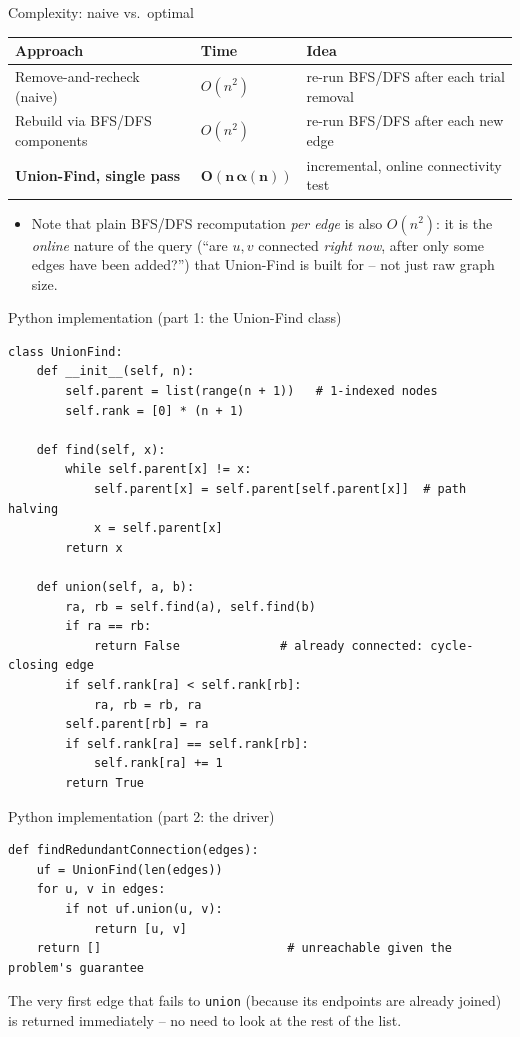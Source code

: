 \documentclass[11pt,aspectratio=169]{beamer}
\begin{document}
\begin{frame}{Complexity: naive vs.\ optimal}
  \begin{center}
  \begin{tabular}{@{}lll@{}}
    \toprule
    Approach & Time & Idea \\
    \midrule
    Remove-and-recheck (naive) & $O(n^2)$ & re-run BFS/DFS after each trial removal \\
    Rebuild via BFS/DFS components & $O(n^2)$ & re-run BFS/DFS after each new edge \\
    \textbf{Union-Find, single pass} & $\boldsymbol{O(n\,\alpha(n))}$ & incremental,
    online connectivity test \\
    \bottomrule
  \end{tabular}
  \end{center}
  \begin{itemize}
    \item Note that plain BFS/DFS recomputation \emph{per edge} is also $O(n^2)$: it is
    the \emph{online} nature of the query (``are $u,v$ connected \emph{right now}, after
    only some edges have been added?'') that Union-Find is built for -- not just raw
    graph size.
  \end{itemize}
\end{frame}

\begin{frame}[fragile]{Python implementation (part 1: the Union-Find class)}
  \begin{lstlisting}[style=py]
class UnionFind:
    def __init__(self, n):
        self.parent = list(range(n + 1))   # 1-indexed nodes
        self.rank = [0] * (n + 1)

    def find(self, x):
        while self.parent[x] != x:
            self.parent[x] = self.parent[self.parent[x]]  # path halving
            x = self.parent[x]
        return x

    def union(self, a, b):
        ra, rb = self.find(a), self.find(b)
        if ra == rb:
            return False              # already connected: cycle-closing edge
        if self.rank[ra] < self.rank[rb]:
            ra, rb = rb, ra
        self.parent[rb] = ra
        if self.rank[ra] == self.rank[rb]:
            self.rank[ra] += 1
        return True
  \end{lstlisting}
\end{frame}

\begin{frame}[fragile]{Python implementation (part 2: the driver)}
  \begin{lstlisting}[style=py]
def findRedundantConnection(edges):
    uf = UnionFind(len(edges))
    for u, v in edges:
        if not uf.union(u, v):
            return [u, v]
    return []                          # unreachable given the problem's guarantee
  \end{lstlisting}
  \vspace{0.5em}
  The very first edge that fails to \texttt{union} (because its endpoints are already
  joined) is returned immediately -- no need to look at the rest of the list.
\end{frame}
\end{document}
